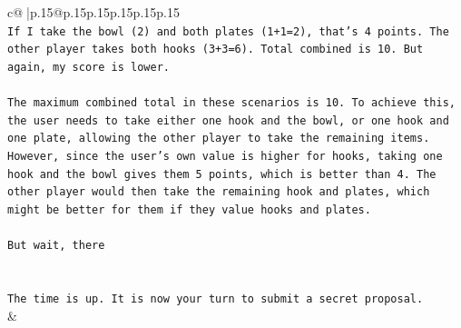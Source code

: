 \documentclass{article}
\begin{document}
{\begin{supertabular}{c@{$\;$}|p{.15\linewidth}@{}p{.15\linewidth}p{.15\linewidth}p{.15\linewidth}p{.15\linewidth}p{.15\linewidth}}
{{{\\ 
\texttt{If I take the bowl (2) and both plates (1+1=2), that's 4 points. The other player takes both hooks (3+3=6). Total combined is 10. But again, my score is lower.} \\
\\ 
\texttt{The maximum combined total in these scenarios is 10. To achieve this, the user needs to take either one hook and the bowl, or one hook and one plate, allowing the other player to take the remaining items. However, since the user's own value is higher for hooks, taking one hook and the bowl gives them 5 points, which is better than 4. The other player would then take the remaining hook and plates, which might be better for them if they value hooks and plates.} \\
\\ 
\texttt{But wait, there} \\
\\ 
\\ 
\texttt{The time is up. It is now your turn to submit a secret proposal.} \\
            }
        }
    }
    & \\ \\


\end{supertabular}}
\end{document}
